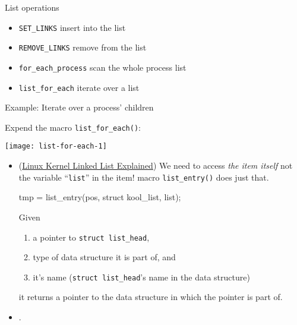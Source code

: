 \begin{frame}
  \begin{block}{List operations}
    \begin{itemize}
    \item[]\texttt{SET\_LINKS} insert into the list
    \item[]\texttt{REMOVE\_LINKS} remove from the list
    \item[]\texttt{for\_each\_process} scan the whole process list
      \begin{center}
      \end{center}
    \item[]\texttt{list\_for\_each} iterate over a list
      \begin{center}
      \end{center}
    \end{itemize}
  \end{block}
  \begin{block}{Example: Iterate over a process' children}
    \begin{center}
    \end{center}
  \end{block}
\end{frame}

Expend the macro \texttt{list\_for\_each()}:
\begin{center}
  \texttt{[image: list-for-each-1]}
\end{center}

\begin{itemize}
\item (\href{http://isis.poly.edu/kulesh/stuff/src/klist/}{Linux Kernel Linked List
    Explained}) We need to access \emph{the item itself} not the variable
  ``\texttt{list}'' in the item! macro \texttt{list\_entry()} does just that.

  \begin{center}
\begin{ccode}
tmp = list_entry(pos, struct kool_list, list);
\end{ccode}
  \end{center}
  Given
  \begin{enumerate}
  \item a pointer to \texttt{struct list\_head},
  \item type of data structure it is part of, and
  \item it's name (\texttt{struct list\_head}'s name in the data structure)
  \end{enumerate}
  it returns a pointer to the data structure in which the pointer is part of.
\item {}.
\end{itemize}

